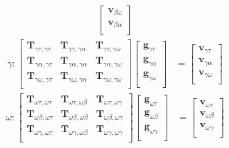 {\begin{align}
\begin{bmatrix}
        \mathbf{v}_{\beta \omega} \\
        \mathbf{v}_{\beta \alpha} \\
    \end{bmatrix}
\end{align}
\begin{align}
    \gamma:
    \begin{bmatrix}
        \mathbf{T}_{\gamma \tau, \gamma \tau} & \mathbf{T}_{\gamma \tau, \gamma \alpha} & \mathbf{T}_{\gamma \tau, \gamma \omega} \\
        \mathbf{T}_{\gamma \alpha, \gamma \tau} & \mathbf{T}_{\gamma \alpha, \gamma \alpha} & \mathbf{T}_{\gamma \alpha, \gamma \omega} \\
        \mathbf{T}_{\gamma \omega, \gamma \tau} & \mathbf{T}_{\gamma \omega, \gamma \alpha} & \mathbf{T}_{\gamma \omega, \gamma \omega} \\
    \end{bmatrix}
    \begin{bmatrix}
        \mathbf{g}_{\gamma \tau} \\
        \mathbf{g}_{\gamma \alpha} \\
        \mathbf{g}_{\gamma \omega} \\
    \end{bmatrix}
    &=
    \begin{bmatrix}
        \mathbf{v}_{\gamma \tau} \\
        \mathbf{v}_{\gamma \alpha} \\
        \mathbf{v}_{\gamma \omega} \\
    \end{bmatrix}
\end{align}
\begin{align}
    \omega:
    \begin{bmatrix}
        \mathbf{T}_{\omega \tau, \omega \tau} & \mathbf{T}_{\omega \tau, \omega \beta} & \mathbf{T}_{\omega \tau, \omega \gamma} \\
        \mathbf{T}_{\omega \beta, \omega \tau} & \mathbf{T}_{\omega \beta, \omega \beta} & \mathbf{T}_{\omega \beta, \omega \gamma} \\
        \mathbf{T}_{\omega \gamma, \omega \tau} & \mathbf{T}_{\omega \gamma, \omega \beta} & \mathbf{T}_{\omega \gamma, \omega \gamma} \\
    \end{bmatrix}
    \begin{bmatrix}
        \mathbf{g}_{\omega \tau} \\
        \mathbf{g}_{\omega \beta} \\
        \mathbf{g}_{\omega \gamma} \\
    \end{bmatrix}
    &=
    \begin{bmatrix}
        \mathbf{v}_{\omega \tau} \\
        \mathbf{v}_{\omega \beta} \\
        \mathbf{v}_{\omega \gamma} \\
    \end{bmatrix}
\end{align}
}

